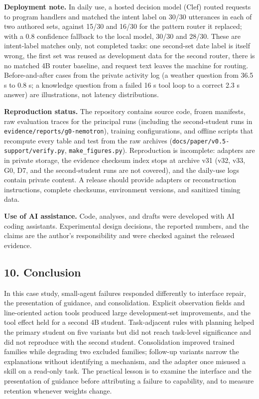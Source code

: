 \documentclass[
  10pt,
]{article}
\begin{document}
\textbf{Deployment note.} In daily use, a hosted decision model (Clef)
routed requests to program handlers and matched the intent label on
30/30 utterances in each of two authored sets, against 15/30 and 16/30
for the pattern router it replaced; with a 0.8 confidence fallback to
the local model, 30/30 and 28/30. These are intent-label matches only,
not completed tasks: one second-set date label is itself wrong, the
first set was reused as development data for the second router, there is
no matched 4B router baseline, and request text leaves the machine for
routing. Before-and-after cases from the private activity log (a weather
question from 36.5 s to 0.8 s; a knowledge question from a failed 16 s
tool loop to a correct 2.3 s answer) are illustrations, not latency
distributions.

\textbf{Reproduction status.} The repository contains source code,
frozen manifests, raw evaluation traces for the principal runs
(including the second-student runs in
\texttt{evidence/reports/g0-nemotron}), training configurations, and
offline scripts that recompute every table and test from the raw
archives (\texttt{docs/paper/v0.5-support/verify.py},
\texttt{make\_figures.py}). Reproduction is incomplete: adapters are in
private storage, the evidence checksum index stops at archive v31 (v32,
v33, G0, D7, and the second-student runs are not covered), and the
daily-use logs contain private content. A release should provide
adapters or reconstruction instructions, complete checksums, environment
versions, and sanitized timing data.

\textbf{Use of AI assistance.} Code, analyses, and drafts were developed
with AI coding assistants. Experimental design decisions, the reported
numbers, and the claims are the author's responsibility and were checked
against the released evidence.

\subsection{10. Conclusion}\label{conclusion}

In this case study, small-agent failures responded differently to
interface repair, the presentation of guidance, and consolidation.
Explicit observation fields and line-oriented action tools produced
large development-set improvements, and the tool effect held for a
second 4B student. Task-adjacent rules with planning helped the primary
student on five variants but did not reach task-level significance and
did not reproduce with the second student. Consolidation improved
trained families while degrading two excluded families; follow-up
variants narrow the explanations without identifying a mechanism, and
the adapter once misused a skill on a read-only task. The practical
lesson is to examine the interface and the presentation of guidance
before attributing a failure to capability, and to measure retention
whenever weights change.
\end{document}
